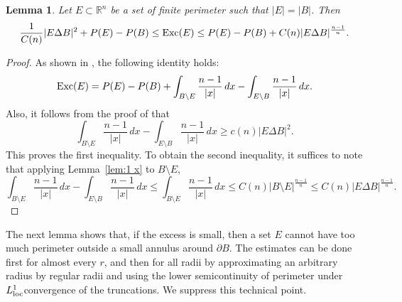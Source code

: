 \documentclass[reqno,11pt]{amsart}
\makeatletter
\newtheorem{lem}[thm]{Lemma}%
\numberwithin{equation}{section}
\theoremstyle{remark}
\makeatother
\begin{document}
\begin{lem}\label{inverse inequ}
Let $E\subset \mathbb R^n$ be a set of finite perimeter such that $|E|=|B|$. Then
$$\frac{1}{C(n)}|E\Delta B|^2 + P(E)-P(B) \leq {\rm Exc}(E)\le P(E)-P(B)+ C(n)|E\Delta B|^{\frac {n-1} {n}}.  $$ 
\end{lem}
\begin{proof}
As shown in \cite[Equation (3.19)]{FJ2014}, the following identity holds:
$${\rm Exc}(E)=P(E)-P(B) + \int_{B\setminus E}\frac{n-1}{|x|}\, dx-\int_{E\setminus B} \frac{n-1}{|x|}\, dx .$$
Also, it follows from the proof of \cite[Proposition 1.2]{FJ2014} that
$$
\int_{B\setminus E}\frac{n-1}{|x|}\, dx-\int_{E\setminus B} \frac{n-1}{|x|}\, dx \geq c(n)|E\Delta B|^2.
$$
This proves the first inequality.
To obtain the second inequality, it suffices to note that applying Lemma~\ref{lem:1 x} to $B\setminus E$,
$$
\int_{B\setminus E}\frac{n-1}{|x|}\, dx-\int_{E\setminus B} \frac{n-1}{|x|}\, dx \leq \int_{B\setminus E}\frac{n-1}{|x|}\, dx\leq C(n)|B\setminus E|^{\frac{n-1}{n}}\leq C(n)|E\Delta B|^{\frac{n-1}{n}}.
$$
\end{proof}

The next lemma shows that, if the excess is small, then a set $E$ cannot have too much perimeter outside a small annulus around $\partial B$. The estimates can be done first for almost every $r$, and then for all radii by approximating an arbitrary radius by regular radii and using the lower semicontinuity of perimeter under $L^1_{\rm loc}$convergence of the truncations. We suppress this technical point.  
\end{document}
